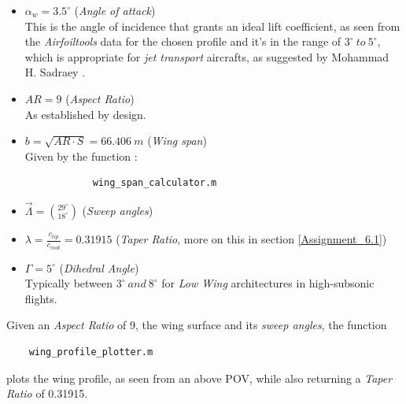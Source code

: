 \documentclass{article}
\begin{document}
\begin{itemize}
    \item $\alpha_w = 3.5^{\circ}$ (\textit{Angle of attack}) \\ 
        This is the angle of incidence that grants an ideal lift coefficient, as seen from the \textit{Airfoiltools}
        \autocite{Airfoiltools} data for the chosen profile and it's in the range of $3^{\circ} \ to \ 5^{\circ}$, 
        which is appropriate for \textit{jet transport} aircrafts, as suggested by Mohammad H. Sadraey \autocite{Sadraey_Mohammad}.
    \item $AR = 9$ (\textit{Aspect Ratio}) \\ 
        As established by design. 
    \item $b = \sqrt{AR \cdot S} = 66.406 \ m$ (\textit{Wing span}) \\ 
        Given by the function \autocite{Airbus_replacement_repo}: 

        \begin{verbatim}
            wing_span_calculator.m
        \end{verbatim}
    \item $\vec{\Lambda} = \binom{29^{\circ}}{18^{\circ}}$ (\textit{Sweep angles})
    \item $\lambda = \frac{c_{tip}}{c_{root}} = 0.31915$ (\textit{Taper Ratio}, more on this in section \ref{Assignment_6.1})
    \item $\Gamma = 5^{\circ}$ (\textit{Dihedral Angle}) \\
        Typically between $3^{\circ} \ and \ 8^{\circ}$ for \textit{Low Wing} architectures in 
        high-subsonic flights.
\end{itemize}
\clearpage 

Given an \textit{Aspect Ratio} of 9, the wing surface and its \textit{sweep angles},
the function 
\begin{verbatim}
    wing_profile_plotter.m
\end{verbatim}
plots the wing profile, as seen from an above POV, while also returning a \textit{Taper Ratio} of 0.31915.\\ 
\end{document}
